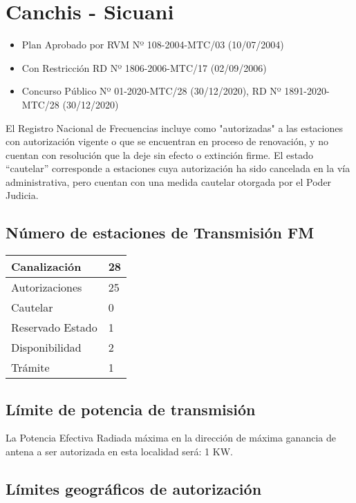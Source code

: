 \documentclass[a4paper]{IEEEtran} %
\begin{document}
\section{Canchis - Sicuani}

\begin{itemize}
	\item Plan Aprobado por RVM Nº 108-2004-MTC/03 (10/07/2004)
	\item Con Restricción RD Nº 1806-2006-MTC/17 (02/09/2006)
	\item Concurso Público Nº 01-2020-MTC/28 (30/12/2020), RD Nº 1891-2020-MTC/28 (30/12/2020)
\end{itemize}

El Registro Nacional de Frecuencias incluye como "autorizadas" a las estaciones con autorización vigente o que se encuentran en proceso de renovación, y no cuentan con resolución que la deje sin efecto o extinción firme. El estado “cautelar” corresponde a estaciones cuya autorización ha sido cancelada en la vía administrativa, pero cuentan con una medida cautelar otorgada por el Poder Judicia.

\subsection{Número de estaciones de Transmisión FM}

\begin{tabular}{|l|l|} \hline
	Canalización 			& 28 \\ \hline
	Autorizaciones			& 25 \\ \hline
	Cautelar				& 0 \\ \hline
	Reservado Estado		& 1 \\ \hline
	Disponibilidad			& 2 \\ \hline
	Trámite					& 1 \\ \hline 
\end{tabular}

\subsection{Límite de potencia de transmisión}

La Potencia Efectiva Radiada máxima en la dirección de máxima ganancia de antena a ser autorizada en esta localidad será: 1 KW.

\subsection{Límites geográficos de autorización}
\end{document}
